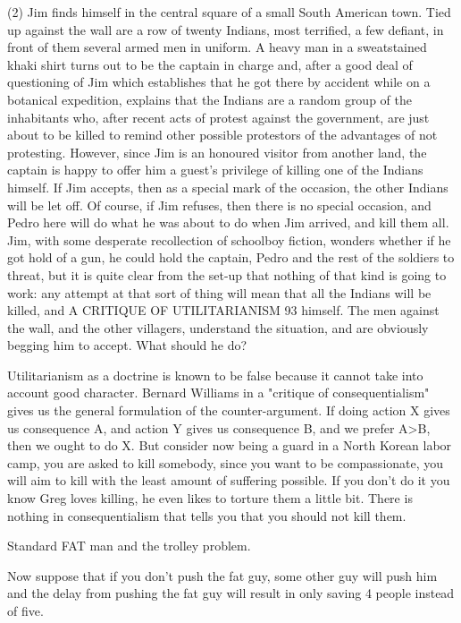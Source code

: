 \documentclass[12pt]{report}
\numberwithin{equation}{section}
\begin{document}
(2) Jim finds himself in the central square of a small South American town.
Tied up against the wall are a row of twenty Indians, most terrified, a few
defiant, in front of them several armed men in uniform. A heavy man in a sweatstained khaki shirt turns out to be the captain in charge and, after a good deal of
questioning of Jim which establishes that he got there by accident while on a
botanical expedition, explains that the Indians are a random group of the
inhabitants who, after recent acts of protest against the government, are just about
to be killed to remind other possible protestors of the advantages of not
protesting. However, since Jim is an honoured visitor from another land, the
captain is happy to offer him a guest’s privilege of killing one of the Indians
himself. If Jim accepts, then as a special mark of the occasion, the other Indians
will be let off. Of course, if Jim refuses, then there is no special occasion, and
Pedro here will do what he was about to do when Jim arrived, and kill them all. Jim,
with some desperate recollection of schoolboy fiction, wonders whether if he got
hold of a gun, he could hold the captain, Pedro and the rest of the soldiers to
threat, but it is quite clear from the set-up that nothing of that kind is going to work:
any attempt at that sort of thing will mean that all the Indians will be killed, and
A CRITIQUE OF UTILITARIANISM 93
himself. The men against the wall, and the other villagers, understand the
situation, and are obviously begging him to accept. What should he do?

Utilitarianism as a doctrine is known to be false because it cannot take into account good character. Bernard Williams in a "critique of consequentialism" gives us the general formulation of the counter-argument. If doing action X gives us consequence A, and action Y gives us consequence B, and we prefer A>B, then we ought to do X. But consider now being a guard in a North Korean labor camp, you are asked to kill somebody, since you want to be compassionate, you will aim to kill with the least amount of suffering possible. If you don't do it you know Greg loves killing, he even likes to torture them a little bit. There is nothing in consequentialism that tells you that you should not kill them. 

Standard FAT man and the trolley problem. 

Now suppose that if you don't push the fat guy, some other guy will push him and the delay from pushing the fat guy will result in only saving 4 people instead of five. 
\end{document}
